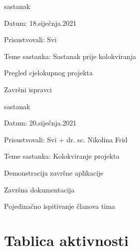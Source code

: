 \begin{packed_enum}
				\item  sastanak
			\item[] \begin{packed_item}
				\item Datum: 18.siječnja.2021
				\item Prisustvovali: Svi
				\item Teme sastanka: Sastanak prije kolokviranja
				\begin{packed_item}
				    \item Pregled cjelokupnog projekta
					\item Završni ispravci
				\end{packed_item}
			\end{packed_item}
			
			
			\item  sastanak
			\item[] \begin{packed_item}
				\item Datum: 20.siječnja.2021
				\item Prisustvovali: Svi + dr. sc. Nikolina Frid
				\item Teme sastanka: Kolokviranje projekta
				\begin{packed_item}
                    \item Demonstracija završne aplikacije
                    \item Završna dokumentacija
                    \item Pojedinačno ispitivanje članova tima
				\end{packed_item}
			\end{packed_item}
			
			
			
			
		\end{packed_enum}
		\eject
		\section*{Tablica aktivnosti}


